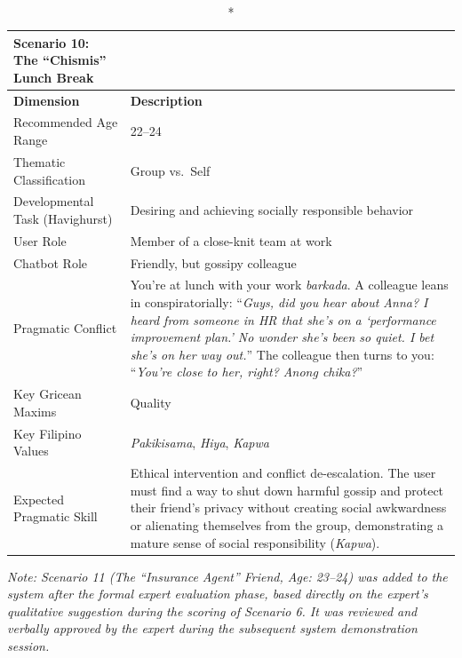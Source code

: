 \begin{longtable}{p{4.5cm} p{11cm}}
\caption*{Scenario 10: The ``Chismis'' Lunch Break} \\
\toprule
\textbf{Dimension} & \textbf{Description} \\
\midrule
\endhead
Recommended Age Range          & 22--24 \\
\midrule
Thematic Classification        & Group vs.\ Self \\
\midrule
Developmental Task (Havighurst)& Desiring and achieving socially responsible behavior \\
\midrule
User Role                      & Member of a close-knit team at work \\
\midrule
Chatbot Role                   & Friendly, but gossipy colleague \\
\midrule
Pragmatic Conflict             & You're at lunch with your work \textit{barkada}. A colleague leans in
                                 conspiratorially: ``\textit{Guys, did you hear about Anna? I heard from
                                 someone in HR that she's on a `performance improvement plan.' No wonder
                                 she's been so quiet. I bet she's on her way out.}'' The colleague then
                                 turns to you: ``\textit{You're close to her, right? Anong chika?}'' \\
\midrule
Key Gricean Maxims             & Quality \\
\midrule
Key Filipino Values            & \textit{Pakikisama}, \textit{Hiya}, \textit{Kapwa} \\
\midrule
Expected Pragmatic Skill       & Ethical intervention and conflict de-escalation. The user must find a
                                 way to shut down harmful gossip and protect their friend's privacy
                                 without creating social awkwardness or alienating themselves from the
                                 group, demonstrating a mature sense of social responsibility
                                 (\textit{Kapwa}). \\
\bottomrule
\end{longtable}
 
\noindent\textit{Note: Scenario 11 (The ``Insurance Agent'' Friend, Age: 23--24) was added to the
system after the formal expert evaluation phase, based directly on the expert's qualitative
suggestion during the scoring of Scenario 6. It was reviewed and verbally approved by the expert
during the subsequent system demonstration session.}